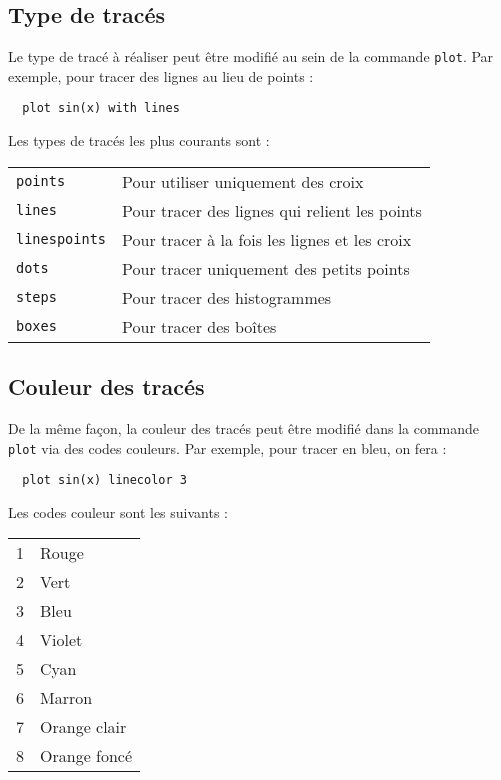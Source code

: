 \documentclass [a4paper]{article}
\begin{document}
\subsection{Type de tracés}

\noindent
Le type de tracé à réaliser peut être modifié au sein de la commande \verb?plot?. Par exemple, pour tracer des lignes au lieu de points :

\begin{verbatim}
  plot sin(x) with lines
\end{verbatim}

\noindent
Les types de tracés les plus courants sont :\\

\begin{tabular}{l|l}
    \verb?points?      & Pour utiliser uniquement des croix\\
    \verb?lines?       & Pour tracer des lignes qui relient les points\\
    \verb?linespoints? & Pour tracer à la fois les lignes et les croix\\
    \verb?dots?        & Pour tracer uniquement des petits points\\
    \verb?steps?       & Pour tracer des histogrammes\\
    \verb?boxes?       & Pour tracer des boîtes\\
\end{tabular}

\subsection{Couleur des tracés}

\noindent
De la même façon, la couleur des tracés peut être modifié dans la commande \verb?plot? via des codes couleurs. Par exemple, pour tracer en bleu, on fera :

\begin{verbatim}
  plot sin(x) linecolor 3
\end{verbatim}

\noindent
Les codes couleur sont les suivants :\\

\begin{tabular}{l|l}
    1 & Rouge\\
    2 & Vert \\
    3 & Bleu\\
    4 & Violet\\
    5 & Cyan\\
    6 & Marron\\
    7 & Orange clair \\
    8 & Orange foncé \\
\end{tabular}
\end{document}
